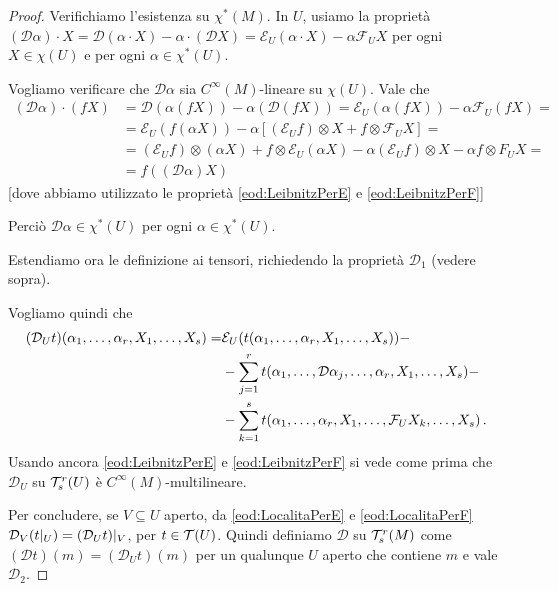 \begin{proof}
	Verifichiamo l'esistenza su $\chi^*(M)$. In $U$, usiamo la proprietà $(\mathcal D\alpha)\cdot X = \mathcal D(\alpha\cdot X) - \alpha\cdot(\mathcal D X) = \mathcal E_U(\alpha\cdot X) - \alpha \mathcal F_UX$ per ogni $X\in\chi(U)$ e per ogni $\alpha \in \chi^*(U)$.
	
	Vogliamo verificare che $\mathcal D\alpha$ sia $C^\infty(M)$-lineare su $\chi(U)$.
	Vale che
	\begin{align*}
		(\mathcal D\alpha) \cdot (fX) &= \mathcal D (\alpha(fX)) -\alpha(\mathcal D(fX)) = \mathcal E_U(\alpha(fX)) - \alpha\mathcal F_U(fX)=\\
		&= \mathcal E_U(f(\alpha X)) - \alpha [(\mathcal E_Uf)\otimes X + f \otimes \mathcal F_UX] = \\
		&= (\mathcal E_U f)\otimes (\alpha X) + f \otimes \mathcal E_U (\alpha X) - \alpha (\mathcal E_U f) \otimes X - \alpha f \otimes F_U X = \\
		&= f((\mathcal D\alpha) X)
	\end{align*}
	[dove abbiamo utilizzato le proprietà \ref{eod:LeibnitzPerE} e \ref{eod:LeibnitzPerF}]
	
	Perciò $\mathcal D\alpha \in \chi^*(U)$ per ogni $\alpha\in\chi^*(U)$.

Estendiamo ora le definizione ai tensori, richiedendo la proprietà $\mathcal D_1$ (vedere sopra).

Vogliamo quindi che
\begin{align*}
	(\mathcal D_U t) (\alpha_1,\ldots,\alpha_r,X_1,\ldots,X_s) =& \mathcal E_U(t(\alpha_1,\ldots,\alpha_r,X_1,\ldots,X_s)) -\\
	&-\sum_{j=1}^rt(\alpha_1,\ldots, \mathcal D\alpha_j,\ldots,\alpha_r,X_1,\ldots,X_s) -\\
	&- \sum_{k=1}^s t(\alpha_1,\ldots,\alpha_r,X_1,\ldots,\mathcal F_UX_k,\ldots,X_s)\, \text{. }
\end{align*}
Usando ancora \ref{eod:LeibnitzPerE} e \ref{eod:LeibnitzPerF} si vede come prima che $\mathcal D_U$ su $\mathcal T_s^r(U)$ è $C^\infty(M)$-multilineare.

Per concludere, se $V\subseteq U$ aperto, da \ref{eod:LocalitaPerE} e \ref{eod:LocalitaPerF} $\mathcal D_V(t|_ U) = (\mathcal D_U t)|_ V$, per $t\in\mathcal T(U)$.
Quindi definiamo $\mathcal D$ su $\mathcal T_s^r(M)$ come $(\mathcal D t) (m) = (\mathcal D_U t) (m)$ per un qualunque $U$ aperto che contiene $m$ e vale $\mathcal D_2$.
\end{proof}

